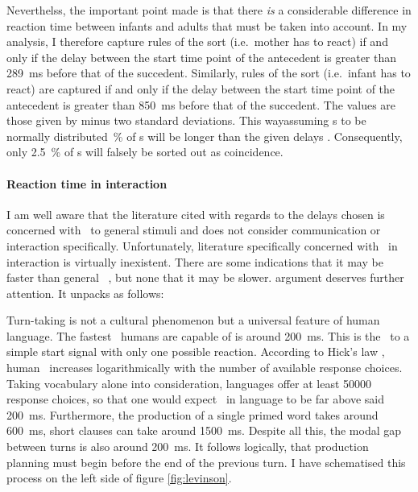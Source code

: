 Neverthelss, the important point made is that there \emph{is} a considerable difference in reaction time between infants and adults that must be taken into account.
In my analysis, I therefore capture rules of the sort  (i.e.~mother has to react) if and only if the delay between the start time point of the antecedent is greater than 289~ms before that of the succedent.
Similarly, rules of the sort  (i.e.~infant has to react) are captured if and only if the delay between the start time point of the antecedent is greater than 850~ms before that of the succedent.
The values are those given by \citet{leibold_relationship_2002} minus two standard deviations.
This way\dash assuming \rt s to be normally distributed~\% of \rt s will be longer than the given delays \citep[]{moore_introduction_2017}.
Consequently, only 2.5~\% of \rt s will falsely be sorted out as coincidence.

\paragraph{Reaction time in interaction}
I am well aware that the literature cited with regards to the delays chosen is concerned with \rt\ to general stimuli and does not consider communication or interaction specifically.
Unfortunately, literature specifically concerned with \rt\ in interaction is virtually inexistent.
There are some indications that it may be faster than general \rt\ \citep{levinson_turn-taking_2016}, but none that it may be slower.
 argument deserves further attention.
It unpacks as follows:

Turn-taking is not a cultural phenomenon but a universal feature of human language.
The fastest \rt\ humans are capable of is around 200~ms.
This is the \rt\ to a simple start signal with only one possible reaction.
According to Hick's law \citep{hick_rate_1952}, human \rt\ increases logarithmically with the number of available response choices.
Taking vocabulary alone into consideration, languages offer at least 50000 response choices, so that one would expect \rt\ in language to be far above said 200~ms.
Furthermore, the production of a single primed word takes around 600~ms, short clauses can take around 1500~ms.
Despite all this, the modal gap between turns is also around 200~ms.
It follows logically, that production planning must begin before the end of the previous turn.
I have schematised this process on the left side of figure \ref{fig:levinson}.

